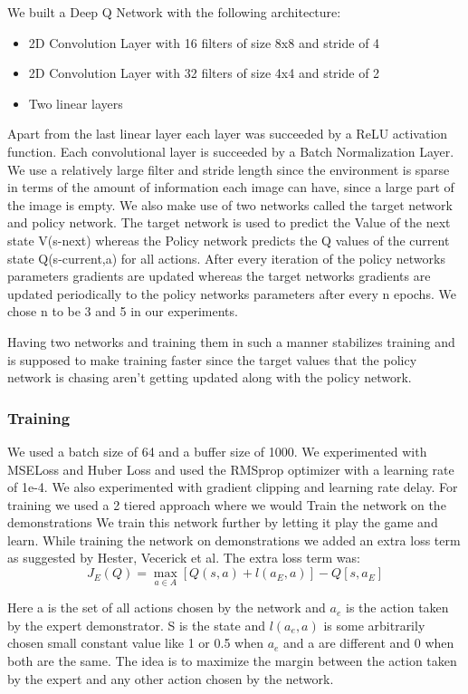 \documentclass[letterpaper, 12 pt, conference]{ieeeconf}
\begin{document}
We built a Deep Q Network with the following architecture:
\begin{itemize}
    \item 2D Convolution Layer with 16 filters of size 8x8 and stride of 4
    \item 2D Convolution Layer with 32 filters of size 4x4 and stride of 2
    \item Two linear layers
\end{itemize}

Apart from the last linear layer each layer was succeeded by a ReLU activation function. Each convolutional layer is succeeded by a Batch Normalization Layer. We use a relatively large filter and stride length since the environment is sparse in terms of the amount of information each image can have, since a large part of the image is empty. 
We also make use of two networks called the target network and policy network. The target network is used to predict the Value of the next state V(s-next)  whereas the Policy network predicts the Q values of the current state Q(s-current,a) for all actions. After every iteration of the policy networks parameters gradients are updated whereas the target networks gradients are updated periodically to the policy networks parameters after every n epochs. We chose n to be 3 and 5 in our experiments. 

Having two networks and training them in such a manner stabilizes training and is supposed to make training faster since the target values that the policy network is  chasing aren't getting updated along with the policy network.

\subsubsection{Training}

We used a batch size of 64 and a buffer size of 1000. We experimented with MSELoss and Huber Loss and used the RMSprop optimizer with a learning rate of 1e-4. We also experimented with gradient clipping and learning rate delay.
For training we used a 2 tiered approach where we would
Train the network on the demonstrations
We  train this network further by letting it play the game and learn.
While training the network on demonstrations we added an extra loss term as suggested by Hester, Vecerick et al\cite{hester2017deep}.
The extra loss term was:
$$ J_E(Q) = \max_{a \in A} [Q(s, a) + l(a_E, a)] - Q[s, a_E] $$

Here a is the set of all actions chosen by the network and $a_e$ is the action taken by the expert demonstrator. S is the state and $l(a_e,a)$ is some arbitrarily chosen small constant value like 1 or 0.5 when $a_e$ and a are different and 0 when both are the same. The idea is to maximize the margin between the action taken by the expert and any other action chosen by the network.
\end{document}
